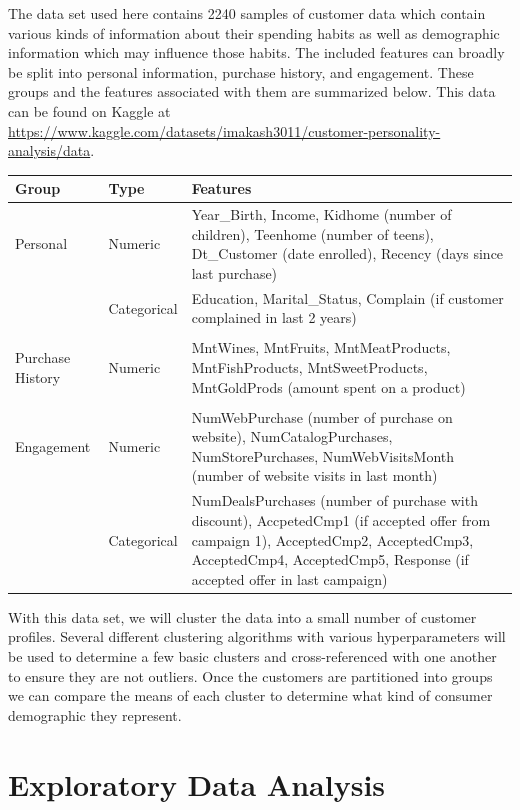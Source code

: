 \documentclass[12pt]{article}
\begin{document}
The data set used here contains 2240 samples of customer data which contain various kinds of information about their spending habits as well as demographic information which may influence those habits. The included features can broadly be split into personal information, purchase history, and engagement. These groups and the features associated with them are summarized below. This data can be found on Kaggle at \url{https://www.kaggle.com/datasets/imakash3011/customer-personality-analysis/data}.
\vspace{1em}

\begin{tabular}{l l p{4in}}
    \toprule
    Group & Type & Features \\
    \midrule
    Personal & Numeric & Year\_Birth, Income, Kidhome (number of children), Teenhome (number of teens), Dt\_Customer (date enrolled), Recency (days since last purchase) \\
     & Categorical & Education, Marital\_Status, Complain (if customer complained in last 2 years) \\
    \\
    Purchase History & Numeric & MntWines, MntFruits, MntMeatProducts, MntFishProducts, MntSweetProducts, MntGoldProds (amount spent on a product) \\
    \\
    Engagement & Numeric & NumWebPurchase (number of purchase on website), NumCatalogPurchases, NumStorePurchases, NumWebVisitsMonth (number of website visits in last month) \\
     & Categorical & NumDealsPurchases (number of purchase with discount), AccpetedCmp1 (if accepted offer from campaign 1), AcceptedCmp2, AcceptedCmp3, AcceptedCmp4, AcceptedCmp5, Response (if accepted offer in last campaign) \\
    \bottomrule
\end{tabular}
\vspace{1em}

With this data set, we will cluster the data into a small number of customer profiles. Several different clustering algorithms with various hyperparameters will be used to determine a few basic clusters and cross-referenced with one another to ensure they are not outliers. Once the customers are partitioned into groups we can compare the means of each cluster to determine what kind of consumer demographic they represent.

\section*{Exploratory Data Analysis}
\end{document}
